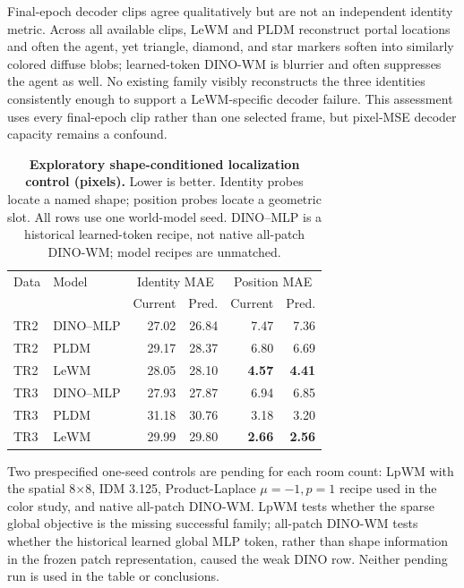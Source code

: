 \documentclass{article}
\begin{document}
Final-epoch decoder clips agree qualitatively but are not an independent
identity metric. Across all available clips, LeWM and PLDM reconstruct portal
locations and often the agent, yet triangle, diamond, and star markers soften
into similarly colored diffuse blobs; learned-token DINO-WM is blurrier and
often suppresses the agent as well. No existing family visibly reconstructs
the three identities consistently enough to support a LeWM-specific decoder
failure. This assessment uses every final-epoch clip rather than one selected
frame, but pixel-MSE decoder capacity remains a confound.

\begin{table}[h]
\centering
\scriptsize
\setlength{\tabcolsep}{3.0pt}
\begin{tabular}{@{}llrrrr@{}}
\toprule
Data & Model & \multicolumn{2}{c}{Identity MAE} & \multicolumn{2}{c}{Position MAE} \\
& & Current & Pred. & Current & Pred. \\
\midrule
TR2 & DINO--MLP & 27.02 & 26.84 & 7.47 & 7.36 \\
TR2 & PLDM & 29.17 & 28.37 & 6.80 & 6.69 \\
TR2 & LeWM & 28.05 & 28.10 & \textbf{4.57} & \textbf{4.41} \\
TR3 & DINO--MLP & 27.93 & 27.87 & 6.94 & 6.85 \\
TR3 & PLDM & 31.18 & 30.76 & 3.18 & 3.20 \\
TR3 & LeWM & 29.99 & 29.80 & \textbf{2.66} & \textbf{2.56} \\
\bottomrule
\end{tabular}
\caption{\textbf{Exploratory shape-conditioned localization control (pixels).} Lower is better.
Identity probes locate a named shape; position probes locate a geometric slot.
All rows use one world-model seed.  DINO--MLP is a historical learned-token
recipe, not native all-patch DINO-WM; model recipes are unmatched.}
\label{tab:shape-control}
\end{table}

Two prespecified one-seed controls are pending for each room count: LpWM with
the spatial 8$\times$8, IDM 3.125, Product-Laplace $\mu=-1,p=1$ recipe used in
the color study, and native all-patch DINO-WM. LpWM tests whether the sparse
global objective is the missing successful family; all-patch DINO-WM tests
whether the historical learned global MLP token, rather than shape information
in the frozen patch representation, caused the weak DINO row. Neither pending
run is used in the table or conclusions.
\end{document}
